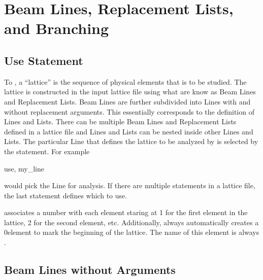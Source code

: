 \chapter{Beam Lines, Replacement Lists, and Branching}
\label{c:sequence}

\section{Use Statement}
\label{s:use}

To \bmad, a ``lattice'' is the sequence of physical
elements that is to be studied. The lattice is constructed in the
input lattice file using what are know as Beam Lines and Replacement
Lists. Beam Lines are further subdivided into Lines with and without
replacement arguments. This essentially corresponds to the \mad
definition of Lines and Lists. There can be multiple Beam Lines and
Replacement Lists defined in a lattice file and Lines and Lists can be
nested inside other Lines and Lists. The particular Line that defines
the lattice to be analyzed by \bmad is selected by the 
statement. For example
\begin{example}
  use, my_line
\end{example}
would pick the Line  for analysis. If there are multiple 
statements in a lattice file, the last  statement defines which
 to use.

\bmad associates a number with each element staring at 1 for the first
element in the lattice, 2 for the second element, etc. Additionally,
\bmad always automatically creates a 0\Th element to mark the
beginning of the lattice. The name of this element is always .

\section{Beam Lines without Arguments}
\label{s:lines.wo.arg}

